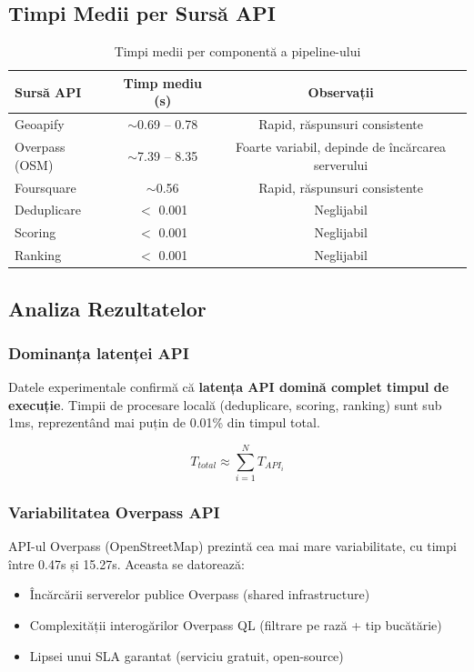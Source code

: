 \documentclass[12pt,a4paper]{article}
\begin{document}
\subsection{Timpi Medii per Sursă API}

\begin{table}[H]
\centering
\begin{tabular}{lcc}
\toprule
\textbf{Sursă API} & \textbf{Timp mediu (s)} & \textbf{Observații} \\
\midrule
Geoapify         & $\sim$0.69 -- 0.78 & Rapid, răspunsuri consistente \\
Overpass (OSM)   & $\sim$7.39 -- 8.35 & Foarte variabil, depinde de încărcarea serverului \\
Foursquare       & $\sim$0.56          & Rapid, răspunsuri consistente \\
\midrule
Deduplicare      & $<$ 0.001          & Neglijabil \\
Scoring          & $<$ 0.001          & Neglijabil \\
Ranking          & $<$ 0.001          & Neglijabil \\
\bottomrule
\end{tabular}
\caption{Timpi medii per componentă a pipeline-ului}
\label{tab:api_times}
\end{table}

\subsection{Analiza Rezultatelor}

\subsubsection{Dominanța latenței API}

Datele experimentale confirmă că \textbf{latența API domină complet timpul de execuție}. Timpii de procesare locală (deduplicare, scoring, ranking) sunt sub 1ms, reprezentând mai puțin de 0.01\% din timpul total.

$$T_{total} \approx \sum_{i=1}^{N} T_{API_i}$$

\subsubsection{Variabilitatea Overpass API}

API-ul Overpass (OpenStreetMap) prezintă cea mai mare variabilitate, cu timpi între 0.47s și 15.27s. Aceasta se datorează:
\begin{itemize}
    \item Încărcării serverelor publice Overpass (shared infrastructure)
    \item Complexității interogărilor Overpass QL (filtrare pe rază + tip bucătărie)
    \item Lipsei unui SLA garantat (serviciu gratuit, open-source)
\end{itemize}
\end{document}
